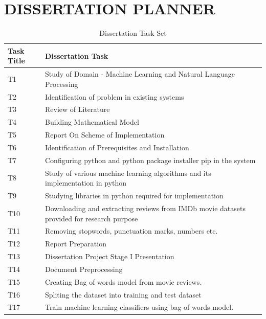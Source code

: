 \documentclass[oneside,a4paper,12pt]{pictreport}
\begin{document}
\chapter{DISSERTATION PLANNER}
\renewcommand{\arraystretch}{1.5}
\begin{table}[]
\centering
\caption{Dissertation Task Set}
\label{my-label}
\begin{tabular}{|l|l|}
\hline
\textbf{Task Title} & \textbf{Dissertation Task}                    \\ \hline
T1                  & Study of Domain - Machine Learning and Natural Language Processing         \\ \hline
T2                  & Identification of problem in existing systems \\ \hline
T3                  & Review of Literature \\ 
\hline
T4                  & Building Mathematical Model \\ 
\hline
T5                  & Report On Scheme of Implementation \\ \hline
T6                  & Identification of Prerequisites and Installation \\ \hline
T7                  & Configuring python and python package installer pip in the system \\ \hline
T8                  & Study of various machine learning algorithms and its implementation in python\\ \hline
T9                  & Studying libraries in python required for implementation \\ \hline
T10                  & Downloading and extracting reviews from IMDb movie datasets provided for research purpose \\ \hline
T11                  & Removing stopwords, punctuation marks, numbers etc.\\ \hline
T12                  & Report Preparation \\ \hline
T13                  & Dissertation Project Stage I Presentation \\ \hline
T14                  & Document Preprocessing
 \\ \hline
T15                  & Creating Bag of words model from movie reviews.
 \\ \hline
T16                  & Spliting the dataset into training and test dataset \\ \hline
T17                  & Train machine learning classifiers using bag of words model.\\ \hline

\end{tabular}
\end{table}
\end{document}
